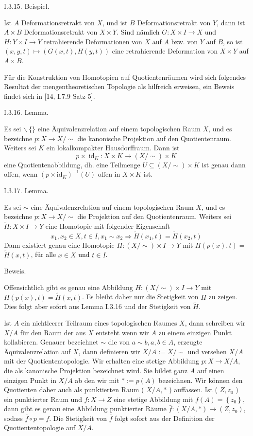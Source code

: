\documentclass[10pt, letterpaper]{article}
\begin{document}
I.3.15. Beispiel. 

Ist $A$ Deformationsretrakt von $X$, und ist $B$ Deformationsretrakt von $Y$, dann ist $A \times B$ Deformationsretrakt von $X \times Y$. Sind nämlich $G: X \times I \rightarrow X$ und $H: Y \times I \rightarrow Y$ retrahierende Deformationen von $X$ auf $A$ bzw. von $Y$ auf $B$, so ist $(x, y, t) \mapsto(G(x, t), H(y, t))$ eine retrahierende Deformation von $X \times Y$ auf $A \times B$.

Für die Konstruktion von Homotopien auf Quotientenräumen wird sich folgendes Resultat der mengentheoretischen Topologie als hilfreich erweisen, ein Beweis findet sich in [14, I.7.9 Satz 5].

I.3.16. Lemma. 

Es sei $\backslash~\{\}$ eine Äquivalenzrelation auf einem topologischen Raum $X$, und es bezeichne $p: X \rightarrow X / \sim$ die kanonische Projektion auf den Quotientenraum. Weiters sei $K$ ein lokalkompakter Hausdorffraum. Dann ist
$$
p \times \operatorname{id}_{K}: X \times K \rightarrow(X / \sim) \times K
$$
eine Quotientenabbildung, dh. eine Teilmenge $U \subseteq(X / \sim) \times K$ ist genau dann offen, wenn $\left(p \times \mathrm{id}_{K}\right)^{-1}(U)$ offen in $X \times K$ ist.


I.3.17. Lemma. 

Es sei $\sim$ eine Äquivalenzrelation auf einem topologischen Raum $X$, und es bezeichne $p: X \rightarrow X / \sim$ die Projektion auf den Quotientenraum. Weiters sei $\tilde{H}: X \times I \rightarrow Y$ eine Homotopie mit folgender Eigenschaft
$$
x_{1}, x_{2} \in X, t \in I, x_{1} \sim x_{2} \Rightarrow \tilde{H}\left(x_{1}, t\right)=\tilde{H}\left(x_{2}, t\right)
$$
Dann existiert genau eine Homotopie $H:(X / \sim) \times I \rightarrow Y$ mit $H(p(x), t)=$ $\tilde{H}(x, t)$, für alle $x \in X$ und $t \in I$.


Beweis. 

Offensichtlich gibt es genau eine Abbildung $H:(X / \sim) \times I \rightarrow Y$ mit $H(p(x), t)=\tilde{H}(x, t)$. Es bleibt daher nur die Stetigkeit von $H$ zu zeigen. Dies folgt aber sofort aus Lemma I.3.16 und der Stetigkeit von $\tilde{H}$.



Ist $A$ ein nichtleerer Teilraum eines topologischen Raumes $X$, dann schreiben wir $X / A$ für den Raum der aus $X$ entsteht wenn wir $A$ zu einem einzigen Punkt kollabieren. Genauer bezeichnet $\sim$ die von $a \sim b, a, b \in A$, erzeugte Äquivalenzrelation auf $X$, dann definieren wir $X / A:=X / \sim$ und versehen $X / A$ mit der Quotiententopologie. Wir erhalten eine stetige Abbildung $p: X \rightarrow X / A$, die als kanonische Projektion bezeichnet wird. Sie bildet ganz $A$ auf einen einzigen Punkt in $X / A$ ab den wir mit $*:=p(A)$ bezeichnen. Wir können den Quotienten daher auch als punktierten Raum ( $X / A, *$ ) auffassen. Ist ( $Z, z_{0}$ ) ein punktierter Raum und $f: X \rightarrow Z$ eine stetige Abbildung mit $f(A)=\left\{z_{0}\right\}$, dann gibt es genau eine Abbildung punktierter Räume $\bar{f}:(X / A, *) \rightarrow\left(Z, z_{0}\right)$, sodass $\bar{f} \circ p=f$. Die Stetigkeit von $\bar{f}$ folgt sofort aus der Definition der Quotiententopologie auf $X / A$.\\
\end{document}
